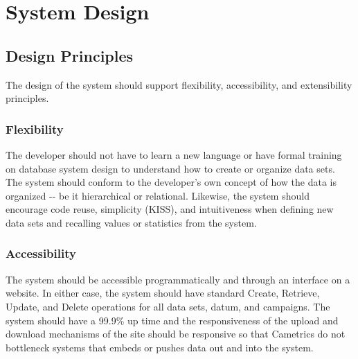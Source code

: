 \documentclass[10pt,a4paper,english]{article}
\begin{document}

\hypertarget{system-design}{}
\section*{System Design}
\label{system-design}



\hypertarget{design-principles}{}
\subsection*{Design Principles}
\label{design-principles}

The design of the system should support flexibility, accessibility, and extensibility principles.



\hypertarget{flexibility}{}
\subsubsection*{Flexibility}
\label{flexibility}

The developer should not have to learn a new language or have formal training on database system design to understand how to create or organize data sets. The system should conform to the developer's own concept of how the data is organized -{}- be it hierarchical or relational. Likewise, the system should encourage code reuse, simplicity (KISS), and intuitiveness when defining new data sets and recalling values or statistics from the system.



\hypertarget{accessibility}{}
\subsubsection*{Accessibility}
\label{accessibility}

The system should be accessible programmatically and through an interface on a website. In either case, the system should have standard Create, Retrieve, Update, and Delete operations for all data sets, datum, and campaigns. The system should have a 99.9{\%} up time and the responsiveness of the upload and download mechanisms of the site should be responsive so that Cametrics do not bottleneck systems that embeds or pushes data out and into the system.
\end{document}
